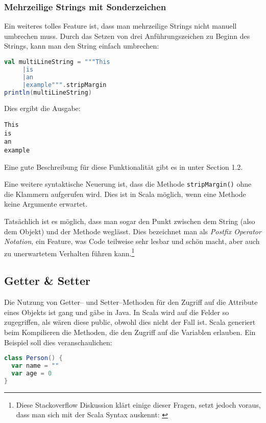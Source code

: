 \subsubsection{Mehrzeilige Strings mit Sonderzeichen}
Ein weiteres tolles Feature ist, dass man mehrzeilige Strings nicht manuell umbrechen muss. Durch das Setzen von drei Anführungszeichen zu Beginn des Strings, kann man den String einfach umbrechen:

\begin{lstlisting}[language=Scala]
val multiLineString = """This
     |is
     |an
     |example""".stripMargin
println(multiLineString)
\end{lstlisting}

Dies ergibt die Ausgabe:

\begin{verbatim}
This
is
an
example
\end{verbatim}

Eine gute Beschreibung für diese Funktionalität gibt es in \cite{ScalaCookbook} unter Section 1.2.

Eine weitere syntaktische Neuerung ist, dass die Methode \texttt{stripMargin()} ohne die Klammern aufgerufen wird. Dies ist in Scala möglich, wenn eine Methode keine Argumente erwartet.

Tatsächlich ist es möglich, dass man sogar den Punkt zwischen dem String (also dem Objekt) und der Methode weglässt. Dies bezeichnet man als \textit{Postfix Operator Notation}, ein Feature, was Code teilweise sehr lesbar und schön macht, aber auch zu unerwartetem Verhalten führen kann.\footnote{Diese Stackoverflow Diskussion klärt einige dieser Fragen, setzt jedoch voraus, dass man sich mit der Scala Syntax auskennt: \cite{StackoverflowDiscussionPostfixOperator}}

\subsection{Getter \& Setter}\label{sec:getter-and-setter}
Die Nutzung von Getter-- und Setter--Methoden für den Zugriff auf die Attribute eines Objekts ist gang und gäbe in Java. In Scala wird auf die Felder so zugegriffen, als wären diese public, obwohl dies nicht der Fall ist. Scala generiert beim Kompilieren die Methoden, die den Zugriff auf die Variablen erlauben. Ein Beispiel soll dies veranschaulichen: \cite{GetterSetterInScala}

\begin{lstlisting}[language=Scala, caption=Beispiel Klasse Person]
class Person() {
  var name = ""
  var age = 0
}
\end{lstlisting}

